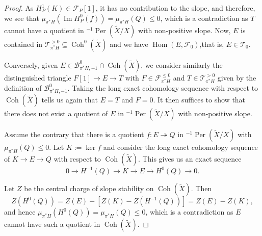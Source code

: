 \documentclass[10pt,a4paper]{amsart}
\DeclareMathOperator{\Coh}{Coh}
\DeclareMathOperator{\Hom}{Hom}
\DeclareMathOperator{\Img}{Im}
\DeclareMathOperator{\Per}{Per}
\begin{document}
\begin{proof}
As $H^1_P(K) \in \mathcal{F}_P[1]$, it has no contribution to the slope, and therefore, we see that $\mu_{\pi^\ast H}(\Img H^0_P(f))=\mu_{\pi^\ast H}(Q) \leq 0$,
which is a contradiction as $T$ cannot have a quotient in $^{-1}\Per(\widetilde{X}/X)$ with non-positive slope.
Now, $E$ is contained in $\mathcal{T}^{>0}_{\pi^\ast H}\subseteq \Coh^0(\widetilde{X})$ and we have $\Hom(E,\mathcal{F}_0)$,that is, $E \in \mathcal{T}_0$.

Conversely, given $E \in \mathcal{B}^0_{\pi^\ast H,-1} \cap \Coh(\widetilde{X})$,
we consider similarly the distinguished triangle $F[1] \longrightarrow E \longrightarrow T$ with $F \in \mathcal{F}^{\leq 0}_{\pi^\ast H}$ and $T \in \mathcal{T}^{> 0}_{\pi^\ast H}$ given by the definition of $\mathcal{B}^0_{\pi^\ast H,-1}$. 
Taking the long exact cohomology sequence with respect to $\Coh(\widetilde{X
})$ tells us again that $E=T$ and $F=0$.
It then suffices to show that there does not exist a quotient of $E$ in $^{-1}\Per(\widetilde{X}/X)$ with non-positive slope.

Assume the contrary that there is a quotient $f \colon E \twoheadrightarrow Q$ in $^{-1}\Per(\widetilde{X}/X)$ with $\mu_{\pi^\ast H}(Q) \leq 0$.
Let $K:= \ker f$ and consider the long exact cohomology sequence of $K \longrightarrow E \longrightarrow Q$ with respect to $\Coh(\widetilde{X})$.
This gives us an exact sequence
$$ 0 \longrightarrow H^{-1}(Q) \longrightarrow K \longrightarrow E
\longrightarrow H^0(Q)
\longrightarrow 0. $$
 
Let $Z$ be the central charge of slope stability on $\Coh(\widetilde{X})$.
Then $$Z(H^0(Q))=Z(E)-[Z(K)-Z(H^{-1}(Q))]=Z(E)-Z(K),$$
and hence $\mu_{\pi^\ast H}(H^0(Q))=\mu_{\pi^\ast H}(Q)\leq0$, which is a contradiction as $E$ cannot have such a quotient in $\Coh(\widetilde{X})$.
\end{proof}
\end{document}
